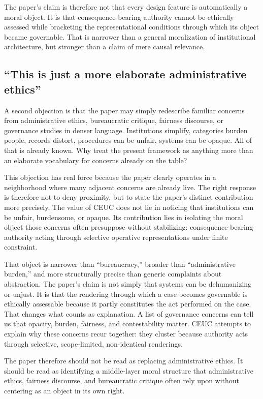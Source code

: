 \documentclass[11pt]{article}
\begin{document}
The paper's claim is therefore not that every design feature is automatically a moral object. It is that consequence-bearing authority cannot be ethically assessed while bracketing the representational conditions through which its object became governable. That is narrower than a general moralization of institutional architecture, but stronger than a claim of mere causal relevance.

\subsection{``This is just a more elaborate administrative ethics''}

A second objection is that the paper may simply redescribe familiar concerns from administrative ethics, bureaucratic critique, fairness discourse, or governance studies in denser language. Institutions simplify, categories burden people, records distort, procedures can be unfair, systems can be opaque. All of that is already known. Why treat the present framework as anything more than an elaborate vocabulary for concerns already on the table?

This objection has real force because the paper clearly operates in a neighborhood where many adjacent concerns are already live. The right response is therefore not to deny proximity, but to state the paper's distinct contribution more precisely. The value of CEUC does not lie in noticing that institutions can be unfair, burdensome, or opaque. Its contribution lies in isolating the moral object those concerns often presuppose without stabilizing: consequence-bearing authority acting through selective operative representations under finite constraint.

That object is narrower than ``bureaucracy,'' broader than ``administrative burden,'' and more structurally precise than generic complaints about abstraction. The paper's claim is not simply that systems can be dehumanizing or unjust. It is that the rendering through which a case becomes governable is ethically assessable because it partly constitutes the act performed on the case. That changes what counts as explanation. A list of governance concerns can tell us that opacity, burden, fairness, and contestability matter. CEUC attempts to explain why these concerns recur together: they cluster because authority acts through selective, scope-limited, non-identical renderings.

The paper therefore should not be read as replacing administrative ethics. It should be read as identifying a middle-layer moral structure that administrative ethics, fairness discourse, and bureaucratic critique often rely upon without centering as an object in its own right.
\end{document}

